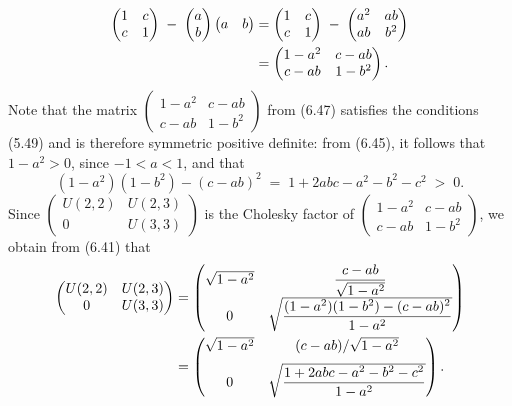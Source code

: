 \begin{align}
\begin{pmatrix} 1 & c \\ c & 1 \end{pmatrix} \;-\; \begin{pmatrix} a \\ b \end{pmatrix}
\begin{pmatrix} a & b \end{pmatrix}
&= \begin{pmatrix} 1 & c \\ c & 1 \end{pmatrix} \;-\; \begin{pmatrix} a^2 & ab \\ ab & b^2 \end{pmatrix} \notag \\
&= \begin{pmatrix} 1-a^2 & c-ab \\ c-ab & 1-b^2 \end{pmatrix}.
\end{align}
Note that the matrix $\begin{pmatrix} 1-a^2 & c-ab \\ c-ab & 1-b^2 \end{pmatrix}$ from
(6.47) satisfies the conditions (5.49) and is therefore symmetric positive definite:
from (6.45), it follows that $1-a^2 > 0$, since $-1 < a < 1$, and that
\[
(1-a^2)(1-b^2) - (c-ab)^2 \;=\; 1+2abc-a^2-b^2-c^2 \;>\; 0.
\]
Since $\begin{pmatrix} U(2,2) & U(2,3) \\ 0 & U(3,3) \end{pmatrix}$ is the Cholesky
factor of $\begin{pmatrix} 1-a^2 & c-ab \\ c-ab & 1-b^2 \end{pmatrix}$, we obtain from
(6.41) that
\begin{align}
\begin{pmatrix} U(2,2) & U(2,3) \\ 0 & U(3,3) \end{pmatrix}
&= \begin{pmatrix} \sqrt{1-a^2} & \dfrac{c-ab}{\sqrt{1-a^2}} \\[0.6em]
0 & \sqrt{\dfrac{(1-a^2)(1-b^2)-(c-ab)^2}{1-a^2}} \end{pmatrix} \notag \\
&= \begin{pmatrix} \sqrt{1-a^2} & (c-ab)/\sqrt{1-a^2} \\[0.6em]
0 & \sqrt{\dfrac{1+2abc-a^2-b^2-c^2}{1-a^2}} \end{pmatrix}.
\end{align}
